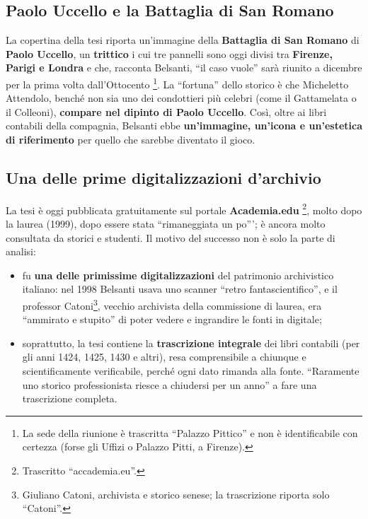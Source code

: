 \subsection{Paolo Uccello e la Battaglia di San Romano}

La copertina della tesi riporta un'immagine della \textbf{Battaglia di San
Romano} di \textbf{Paolo Uccello}, un \textbf{trittico} i cui tre pannelli sono
oggi divisi tra \textbf{Firenze, Parigi e Londra} e che, racconta Belsanti,
``il caso vuole'' sarà riunito a dicembre per la prima volta dall'Ottocento%
\footnote{La sede della riunione è trascritta ``Palazzo Pittico'' e non è
identificabile con certezza (forse gli Uffizi o Palazzo Pitti, a Firenze).}.
La ``fortuna'' dello storico è che Micheletto Attendolo, benché non sia uno dei
condottieri più celebri (come il Gattamelata o il Colleoni), \textbf{compare nel
dipinto di Paolo Uccello}. Così, oltre ai libri contabili della compagnia,
Belsanti ebbe \textbf{un'immagine, un'icona e un'estetica di riferimento} per
quello che sarebbe diventato il gioco.

\subsection{Una delle prime digitalizzazioni d'archivio}

La tesi è oggi pubblicata gratuitamente sul portale \textbf{Academia.edu}%
\footnote{Trascritto ``accademia.eu''.}, molto dopo la laurea (1999), dopo
essere stata ``rimaneggiata un po'''; è ancora molto consultata da storici e
studenti. Il motivo del successo non è solo la parte di analisi:
\begin{itemize}
  \item fu \textbf{una delle primissime digitalizzazioni} del patrimonio
        archivistico italiano: nel 1998 Belsanti usava uno scanner ``retro
        fantascientifico'', e il professor Catoni\footnote{Giuliano Catoni,
        archivista e storico senese; la trascrizione riporta solo
        ``Catoni''.}, vecchio archivista della commissione di laurea, era
        ``ammirato e stupito'' di poter vedere e ingrandire le fonti in digitale;
  \item soprattutto, la tesi contiene la \textbf{trascrizione integrale} dei
        libri contabili (per gli anni 1424, 1425, 1430 e altri), resa
        comprensibile a chiunque e scientificamente verificabile, perché ogni
        dato rimanda alla fonte. ``Raramente uno storico professionista riesce a
        chiudersi per un anno'' a fare una trascrizione completa.
\end{itemize}

